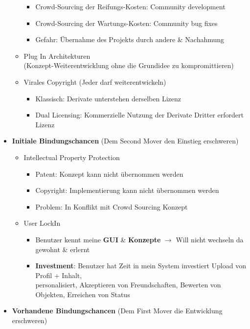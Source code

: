 \documentclass{article} %
\begin{document}
\begin{itemize}
\begin{itemize}
				\begin{itemize}
					\item Crowd-Sourcing der Reifungs-Kosten: Community development
					\item Crowd-Sourcing der Wartungs-Kosten: Community bug fixes
					\item Gefahr: Übernahme des Projekts durch andere \& Nachahmung
				\end{itemize}
				\item Plug In Architekturen\\
				(Konzept-Weiterentwicklung ohne die Grundidee zu kompromittieren)
				\item Virales Copyright (Jeder darf weiterentwickeln)
				\begin{itemize}
					\item Klassisch: Derivate unterstehen derselben Lizenz
					\item Dual Licensing: Kommerzielle Nutzung der Derivate Dritter erfordert Lizenz
				\end{itemize}
			\end{itemize}
			\item \textbf{Initiale Bindungschancen} (Dem Second Mover den Einstieg erschweren)
			\begin{itemize}
				\item Intellectual Property Protection
				\begin{itemize}
					\item Patent: Konzept kann nicht übernommen werden
					\item Copyright: Implementierung kann nicht übernommen werden
					\item Problem: In Konflikt mit Crowd Sourcing Konzept
				\end{itemize}
				\item User LockIn
				\begin{itemize}
					\item Benutzer kennt meine \textbf{GUI} \& \textbf{Konzepte} $\rightarrow$ Will nicht wechseln da gewohnt \& erlernt
					\item \textbf{Investment}: Benutzer hat Zeit in mein System investiert Upload von Profil + Inhalt, \\
					personalisiert, Akzeptieren von Freundschaften, Bewerten von Objekten, Erreichen von Status
				\end{itemize}
			\end{itemize}
			\item \textbf{Vorhandene Bindungschancen} (Dem First Mover die Entwicklung erschweren)			

\end{itemize}
\end{document}
